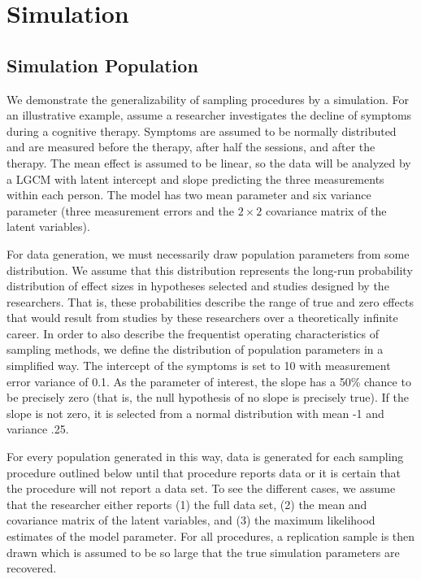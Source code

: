 \documentclass[man]{apa7}
\theoremstyle{definition}
\begin{document}
\section{Simulation}
\subsection{Simulation Population}
We demonstrate the generalizability of sampling procedures by a simulation. For an illustrative example, assume a researcher investigates the decline of symptoms during a cognitive therapy. Symptoms are assumed to be normally distributed and are measured before the therapy, after half the sessions, and after the therapy. The mean effect is assumed to be linear, so the data will be analyzed by a LGCM with latent intercept and slope predicting the three measurements within each person. The model has two mean parameter and six variance parameter (three measurement errors and the $2\times2$ covariance matrix of the latent variables). 

For data generation, we must necessarily draw population parameters from some distribution.  We assume that this distribution represents the long-run probability distribution of effect sizes in hypotheses selected and studies designed by the researchers.  That is, these probabilities describe the range of true and zero effects that would result from studies by these researchers over a theoretically infinite career.  In order to also describe the frequentist operating characteristics of sampling methods, we define the distribution of population parameters in a simplified way. The intercept of the symptoms is set to 10 with measurement error variance of 0.1.  As the parameter of interest, the slope has a 50\% chance to be precisely zero (that is, the null hypothesis of no slope is precisely true).  If the slope is not zero, it is selected from a normal distribution with mean -1 and variance .25.

For every population generated in this way, data is generated for each sampling procedure outlined below until that procedure reports data or it is certain that the procedure will not report a data set. To see the different cases, we assume that the researcher either reports (1) the full data set, (2) the mean and covariance matrix of the latent variables, and %
(3) the maximum likelihood estimates of the model parameter. For all procedures, a replication sample is then drawn which is assumed to be so large that the true simulation parameters are recovered. 
\end{document}
